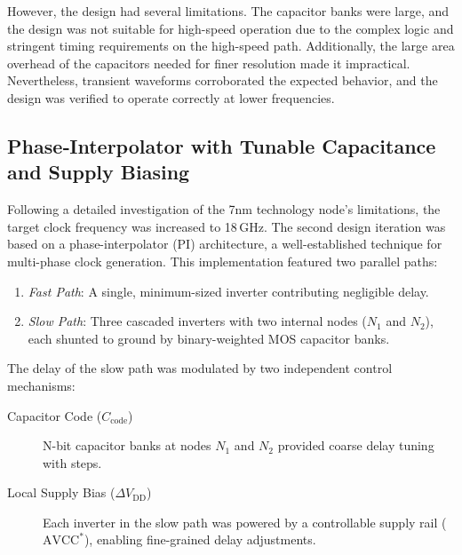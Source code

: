 However, the design had several limitations. The capacitor banks were large, and the design was not suitable for high-speed operation due to the complex logic and stringent timing requirements on the high-speed path. Additionally, the large area overhead of the capacitors needed for finer resolution made it impractical. Nevertheless, transient waveforms corroborated the expected behavior, and the design was verified to operate correctly at lower frequencies.

\subsection{Phase‑Interpolator with Tunable Capacitance and Supply Biasing}\label{sec:pi_cap_supply}

Following a detailed investigation of the 7nm technology node's limitations, the target clock frequency was increased to 18\,GHz. The second design iteration was based on a phase-interpolator (PI) architecture, a well-established technique for multi-phase clock generation. This implementation featured two parallel paths:

\begin{enumerate}
  \item \emph{Fast Path}: A single, minimum-sized inverter contributing negligible delay.
  \item \emph{Slow Path}: Three cascaded inverters with two internal nodes ($N_1$ and $N_2$), each shunted to ground by binary-weighted MOS capacitor banks.
\end{enumerate}

The delay of the slow path was modulated by two independent control mechanisms:
\begin{description}
  \item[Capacitor Code ($C_\text{code}$)] N-bit capacitor banks at nodes $N_1$ and $N_2$ provided coarse delay tuning with steps.
  \item[Local Supply Bias ($\Delta V_\text{DD}$)] Each inverter in the slow path was powered by a controllable supply rail ($\text{AVCC}^*$), enabling fine-grained delay adjustments.
\end{description}

